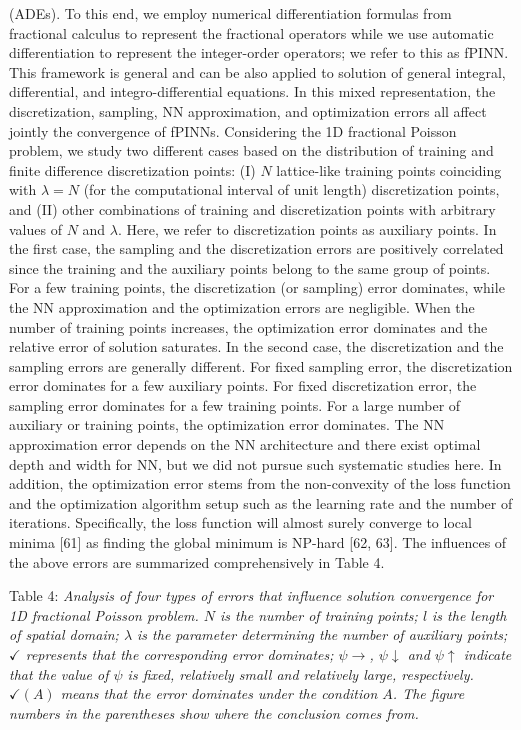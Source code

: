 \documentclass[UTF8]{article}
\begin{document}
(ADEs). To this end, we employ numerical differentiation formulas from fractional calculus to represent the fractional operators while we use automatic differentiation to represent the integer-order operators; we refer to this as fPINN. This framework is general and can be also applied to solution of general integral, differential, and integro-differential equations. In this mixed representation, the discretization, sampling, NN approximation, and optimization errors all affect jointly the convergence of fPINNs. Considering the 1D fractional Poisson problem, we study two different cases based on the distribution of training and finite difference discretization points: (I) $N$ lattice-like training points coinciding with $\lambda = N$ (for the computational interval of unit length) discretization points, and (II) other combinations of training and discretization points with arbitrary values of $N$ and $\lambda$. Here, we refer to discretization points as auxiliary points. In the first case, the sampling and the discretization errors are positively correlated since the training and the auxiliary points belong to the same group of points. For a few training points, the discretization (or sampling) error dominates, while the NN approximation and the optimization errors are negligible. When the number of training points increases, the optimization error dominates and the relative error of solution saturates. In the second case, the discretization and the sampling errors are generally different. For fixed sampling error, the discretization error dominates for a few auxiliary points. For fixed discretization error, the sampling error dominates for a few training points. For a large number of auxiliary or training points, the optimization error dominates. The NN approximation error depends on the NN architecture and there exist optimal depth and width for NN, but we did not pursue such systematic studies here. In addition, the optimization error stems from the non-convexity of the loss function and the optimization algorithm setup such as the learning rate and the number of iterations. Specifically, the loss function will almost surely converge to local minima [61] as finding the global minimum is NP-hard [62, 63]. The influences of the above errors are summarized comprehensively in Table 4.

Table 4: \textit{Analysis of four types of errors that influence solution convergence for 1D fractional Poisson problem. $N$ is the number of training points; $l$ is the length of spatial domain; $\lambda$ is the parameter determining the number of auxiliary points; $\checkmark$ represents that the corresponding error dominates; $\psi \to$, $\psi \downarrow$ and $\psi \uparrow$ indicate that the value of $\psi$ is fixed, relatively small and relatively large, respectively. $\checkmark(A)$ means that the error dominates under the condition $A$. The figure numbers in the parentheses show where the conclusion comes from.}
\end{document}
